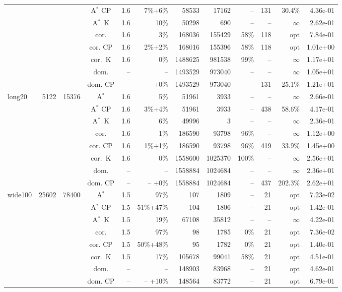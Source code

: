 \documentclass[11pt]{amsart}
\newenvironment{outdent}
{\begin{list}{}{\leftmargin-2cm\rightmargin\leftmargin}\centering\item\relax}
{\end{list}\ignorespacesafterend}
\theoremstyle{plain}
\theoremstyle{remark}
\begin{document}
\begin{table}
\begin{outdent}
\begin{footnotesize}
\begin{tabular}{|l|rrc|rr|rrr|rr|r|}
&&&A$^*$ CP & 1.6 & 7\%+6\% &58533 & 17162 & -- &131 & 30.4\% & 4.36e-01 \\
&&&A$^*$~K & 1.6 & 10\% &50298 & 690 & -- & -- &$\infty$ & 2.62e-01 \\
&&&cor. & 1.6 & 3\% &168036 & 155429 & 58\% &118 & opt & 7.84e-01 \\
&&&cor. CP & 1.6 & 2\%+2\% &168016 & 155396 & 58\% &118 & opt & 1.01e+00 \\
&&&cor.~K & 1.6 & 0\% &1488625 & 981538 & 99\% & -- &$\infty$ & 1.17e+01 \\
&&&dom. & -- & --  &1493529 & 973040 & -- & -- &$\infty$ & 1.05e+01 \\
&&&dom. CP & -- & -- +0\% &1493529 & 973040 & -- &131 & 25.1\% & 1.21e+01 \\
\hline
long20 & 5122 & 15376 & A$^*$ & 1.6 & 5\% &51961 & 3933 & -- & -- &$\infty$ & 2.66e-01 \\
&&&A$^*$ CP & 1.6 & 3\%+4\% &51961 & 3933 & -- &438 & 58.6\% & 4.17e-01 \\
&&&A$^*$~K & 1.6 & 6\% &49996 & 3 & -- & -- &$\infty$ & 2.36e-01 \\
&&&cor. & 1.6 & 1\% &186590 & 93798 & 96\% & -- &$\infty$ & 1.12e+00 \\
&&&cor. CP & 1.6 & 1\%+1\% &186590 & 93798 & 96\% &419 & 33.9\% & 1.45e+00 \\
&&&cor.~K & 1.6 & 0\% &1558600 & 1025370 & 100\% & -- &$\infty$ & 2.56e+01 \\
&&&dom. & -- & --  &1558884 & 1024684 & -- & -- &$\infty$ & 2.36e+01 \\
&&&dom. CP & -- & -- +0\% &1558884 & 1024684 & -- &437 & 202.3\% & 2.62e+01 \\
\hline
wide100 & 25602 & 78400 & A$^*$ & 1.5 & 97\% &107 & 1809 & -- &21 & opt & 7.23e-02 \\
&&&A$^*$ CP & 1.5 & 51\%+47\% &104 & 1806 & -- &21 & opt & 1.42e-01 \\
&&&A$^*$~K & 1.5 & 19\% &67108 & 35812 & -- & -- &$\infty$ & 4.22e-01 \\
&&&cor. & 1.5 & 97\% &98 & 1785 & 0\% &21 & opt & 7.36e-02 \\
&&&cor. CP & 1.5 & 50\%+48\% &95 & 1782 & 0\% &21 & opt & 1.40e-01 \\
&&&cor.~K & 1.5 & 17\% &105678 & 99041 & 58\% &21 & opt & 4.51e-01 \\
&&&dom. & -- & --  &148903 & 83968 & -- &21 & opt & 4.62e-01 \\
&&&dom. CP & -- & -- +10\% &148564 & 83772 & -- &21 & opt & 6.79e-01 \\

\end{tabular}
\end{footnotesize}
\end{outdent}
\end{table}
\end{document}
